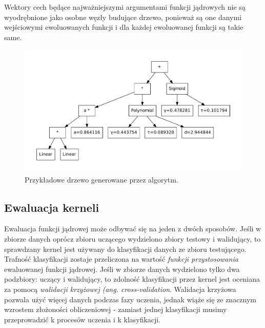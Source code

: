 \documentclass{article}
\begin{document}
Wektory cech będące najważniejszymi argumentami funkcji jądrowych nie są wyodrębnione jako osobne węzły budujące drzewo, ponieważ są one danymi wejściowymi ewoluowanych funkcji i dla każdej ewoluowanej funkcji są takie same.		

\begin{figure}[h]
\centering
\includegraphics[scale=0.6]{figures/tree}
\caption{Przykładowe drzewo generowane przez algorytm.\label{fig:tree}}
\end{figure}


\subsection{Ewaluacja kerneli}
Ewaluacja funkcji jądrowej może odbywać się na jeden z dwóch sposobów. Jeśli w zbiorze danych oprócz zbioru uczącego wydzielono zbiory testowy i walidujący, to sprawdzany kernel jest używany do klasyfikacji danych ze zbioru testującego. Trafność klasyfikacji zostaje przeliczona na wartość \textit{ funkcji przystosowania} ewaluowanej funkcji jądrowej.
Jeśli w zbiorze danych wydzielono tylko dwa podzbiory: uczący i walidujący, to zdolność klasyfikacji przez kernel jest oceniana za pomocą \textit{walidacji krzyżowej (ang. cross-validation}.
Walidacja krzyżowa pozwala użyć więcej danych podczas fazy uczenia, jednak wiąże się ze znacznym wzrostem złożoności obliczeniowej - zamiast jednej klasyfikacji musimy przeprowadzić k procesów uczenia i k klasyfikacji.
\end{document}
